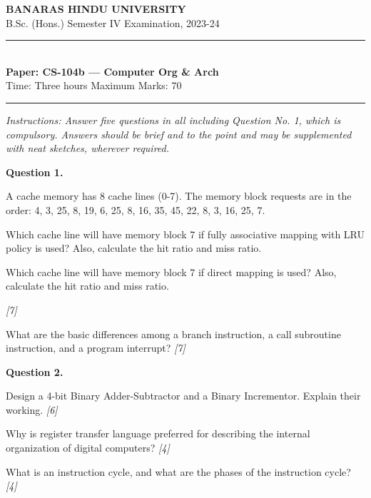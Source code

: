 \documentclass[11pt,a4paper]{article}
\newcommand{\pts}[1]{\hfill   \textit{[#1]}}
\begin{document}
\begin{center}
  {\large\bfseries BANARAS HINDU UNIVERSITY}\\[2pt]
  {
\normalsize B.Sc. (Hons.) Semester IV Examination, 2023-24}\\[6pt]
  \rule{0.8\linewidth}{0.5pt}\\[6pt]
  {\large\bfseries Paper: CS-104b --- Computer Org \& Arch}\\[4pt]
  {
\normalsize Time: Three hours \hfill Maximum Marks: 70}
\end{center}

\rule{\linewidth}{0.4pt}

\smallskip



\noindent   \textit{Instructions: Answer five questions in all including Question No. 1, which is compulsory. Answers should be brief and to the point and may be supplemented with neat sketches, wherever required.}

\bigskip

\medskip


\noindent   \textbf{Question 1.}

\begin{parts}
  \item A cache memory has 8 cache lines (0-7). The memory block requests are in the order: 4, 3, 25, 8, 19, 6, 25, 8, 16, 35, 45, 22, 8, 3, 16, 25, 7.
  
\begin{parts}
    \item Which cache line will have memory block 7 if fully associative mapping with LRU policy is used? Also, calculate the hit ratio and miss ratio.
    \item Which cache line will have memory block 7 if direct mapping is used? Also, calculate the hit ratio and miss ratio.
  \end{parts} \pts{7}
  \item What are the basic differences among a branch instruction, a call subroutine instruction, and a program interrupt? \pts{7}
\end{parts}

\medskip


\noindent   \textbf{Question 2.}

\begin{parts}
  \item Design a 4-bit Binary Adder-Subtractor and a Binary Incrementor. Explain their working. \pts{6}
  \item Why is register transfer language preferred for describing the internal organization of digital computers? \pts{4}
  \item What is an instruction cycle, and what are the phases of the instruction cycle? \pts{4}
\end{parts}
\end{document}
